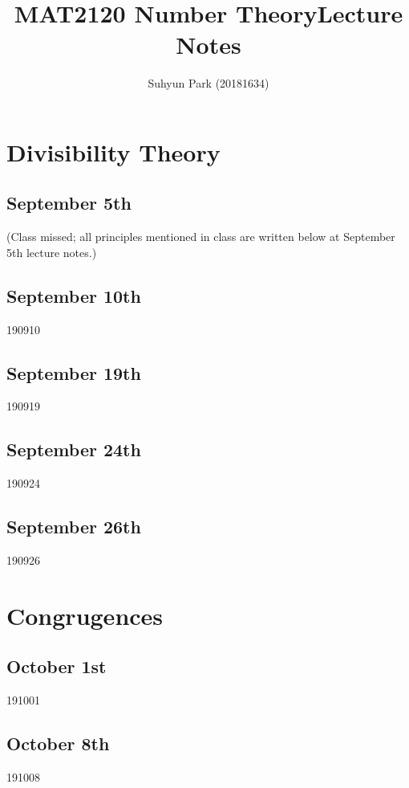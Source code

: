 



\title{MAT2120 Number Theory\newline\space Lecture Notes}
\author{Suhyun Park (20181634)}

\maketitle

\section{Divisibility Theory}
\subsection{September 5th}
(Class missed; all principles mentioned in class are written below at September 5th lecture notes.)

\subsection{September 10th}
{190910}

\subsection{September 19th}
{190919}

\subsection{September 24th}
{190924}

\subsection{September 26th}
{190926}

\section{Congrugences}
\subsection{October 1st}
{191001}

\subsection{October 8th}
{191008}

